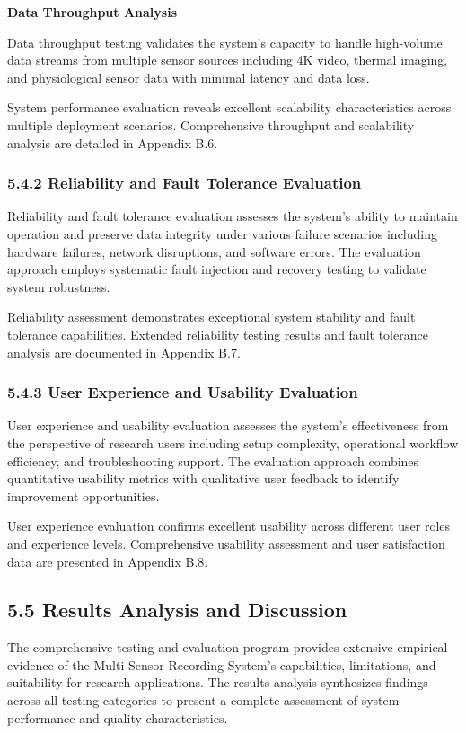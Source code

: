 \documentclass[12pt,a4paper]{article}
\begin{document}
\textbf{Data Throughput Analysis}

Data throughput testing validates the system's capacity to handle high-volume data streams from multiple sensor sources
including 4K video, thermal imaging, and physiological sensor data with minimal latency and data loss.

System performance evaluation reveals excellent scalability characteristics across multiple deployment scenarios.
Comprehensive throughput and scalability analysis are detailed in Appendix B.6.

\subsubsection{5.4.2 Reliability and Fault Tolerance Evaluation}

Reliability and fault tolerance evaluation assesses the system's ability to maintain operation and preserve data
integrity under various failure scenarios including hardware failures, network disruptions, and software errors. The
evaluation approach employs systematic fault injection and recovery testing to validate system robustness.

Reliability assessment demonstrates exceptional system stability and fault tolerance capabilities. Extended reliability
testing results and fault tolerance analysis are documented in Appendix B.7.

\subsubsection{5.4.3 User Experience and Usability Evaluation}

User experience and usability evaluation assesses the system's effectiveness from the perspective of research users
including setup complexity, operational workflow efficiency, and troubleshooting support. The evaluation approach
combines quantitative usability metrics with qualitative user feedback to identify improvement opportunities.

User experience evaluation confirms excellent usability across different user roles and experience levels. Comprehensive
usability assessment and user satisfaction data are presented in Appendix B.8.

\subsection{5.5 Results Analysis and Discussion}

The comprehensive testing and evaluation program provides extensive empirical evidence of the Multi-Sensor Recording
System's capabilities, limitations, and suitability for research applications. The results analysis synthesizes findings
across all testing categories to present a complete assessment of system performance and quality characteristics.
\end{document}
